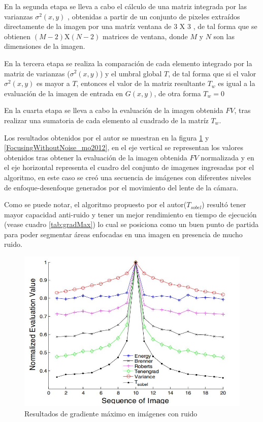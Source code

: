 En la segunda etapa se lleva a cabo el cálculo de una matriz integrada por las varianzas $\sigma^2(x,y)$ , obtenidas a partir de un conjunto de pixeles extraídos directamente de la imagen por una matríz ventana de 3 X 3 , de tal forma que se obtienen $(M-2)$X$(N-2)$ matrices de ventana, donde $M$ y $N$ son las dimensiones de la imagen. 

En la tercera etapa se realiza la comparación de cada elemento integrado por la matriz de varianzas ($\sigma^2(x,y)$) y el umbral global $T$, de tal forma que si el valor $\sigma^2(x,y)$ es mayor a $T$, entonces el valor de la matriz resultante $T_w$ es igual a la evaluación de la imagen de entrada en $G(x,y)$, de otra forma $T_w = 0$ 

En la cuarta etapa se lleva a cabo la evaluación de la imagen obtenida $FV$, tras realizar una sumatoria de cada elemento al cuadrado de la matríz $T_w$.


Los resultados obtenidos por el autor se muestran en la figura \ref{FocusingWithNoise_mo2012} y \ref{FocusingWithoutNoise_mo2012}, en el eje vertical se representan los valores obtenidos tras obtener la evaluación de la imagen obtenida $FV$ normalizada y en el eje horizontal representa el cuadro del conjunto de imagenes ingresadas por el algoritmo, en este caso se creó una secuencia de imágenes con diferentes niveles de enfoque-desenfoque generados por el movimiento del lente de la cámara.

Como se puede notar, el algoritmo propuesto por el autor($T_{sobel}$) resultó tener mayor capacidad anti-ruido y tener un mejor rendimiento en tiempo de ejecución (vease cuadro \ref{tab:gradMax}) lo cual se posiciona como un buen punto de partida para poder segmentar áreas enfocadas en una imagen en presencia de mucho ruido.

\begin{figure}
\centering
\includegraphics[width=\textwidth]{GraficosEdArt/FocusingWithNoise-mo2012.jpg}
\caption{Resultados de gradiente máximo en imágenes con ruido \citet{Mo2012}}
\label{FocusingWithNoise_mo2012}
\end{figure}

